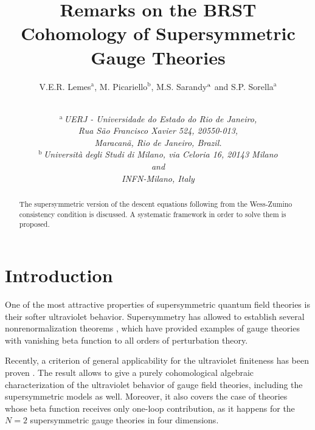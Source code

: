 \documentclass[a4paper,12pt]{article}
\def\Red{}%
\def\Black{}%
\def\Blue{}%
\begin{document}
\title{\Red\textbf{Remarks on the BRST Cohomology of Supersymmetric Gauge Theories \Black}%
\vspace{4mm}\bigskip }
\author{V.E.R. Lemes$^{\mathrm{a}}$, M. Picariello$^{\mathrm{b}}$, M.S. Sarandy$^{%
\mathrm{a}}$ and S.P. Sorella$^{\mathrm{a}}$ \and \textbf{\ }\vspace{3mm} \\
$^{\mathrm{a}}\,${\small {\textit{UERJ - Universidade do Estado do Rio de
Janeiro,}}} \\
{\small {\textit{Rua S\~{a}o Francisco Xavier 524, 20550-013, }}}\\
{\small {\textit{Maracan\~{a}, Rio de Janeiro, Brazil.}}}\vspace{3mm}\\
$^{\mathrm{b}}\,${\small {\textit{Universit{\`{a}} degli Studi di Milano,
via  {\small Celoria 16, 20143 Milano }}}}\\
{\small {\textit{and }}}\\
{\small {\textit{INFN-Milano, Italy}}}}
\maketitle

\begin{abstract}\Blue
The supersymmetric version of the descent equations following from the
Wess-Zumino consistency condition is discussed. A systematic framework in
order to solve them is proposed. \ 
\Black
\newpage
\end{abstract}

\section{Introduction}

One of the most attractive properties of supersymmetric quantum field
theories is their softer ultraviolet behavior. Supersymmetry has allowed to
establish several nonrenormalization theorems \cite{nr}, which have provided
examples of gauge theories with vanishing beta function to all orders of
perturbation theory.

Recently, a criterion of general applicability for the ultraviolet
finiteness has been proven \cite{th}. The result allows to give a purely
cohomological algebraic characterization of the ultraviolet behavior of
gauge field theories, including the supersymmetric models as well. Moreover,
it also covers the case of theories whose beta function receives only
one-loop contribution, as it happens for the $N=2$ supersymmetric gauge
theories in four dimensions.
\end{document}
